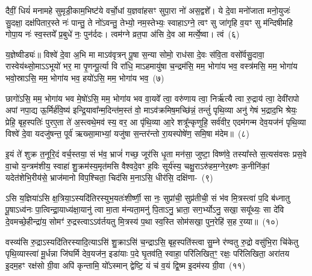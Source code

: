 {\anuvakamend[{मा॒ योनि॑रसि त्रि॒ꣳ॒शच्च॑}]}

दैवीं॒ धियं॑ मनामहे सुमृडी॒काम॒भिष्ट॑ये वर्चो॒धां य॒ज्ञवा॑हसꣳ सुपा॒रा नो॑ अस॒द्वशे᳚। ये दे॒वा मनो॑जाता मनो॒युजः॑ सु॒दक्षा॒ दक्ष॑पितार॒स्ते नः॑ पान्तु॒ ते नो॑\-ऽवन्तु॒ तेभ्यो॒ नम॒स्तेभ्यः॒ स्वाहा\-ऽग्ने॒ त्वꣳ सु जा॑गृहि व॒यꣳ सु म॑न्दिषीमहि गोपा॒य नः॑ स्व॒स्तये᳚ प्र॒बुधे॑ नः॒ पुन॑र्ददः। त्वम॑ग्ने व्रत॒पा अ॑सि दे॒व आ मर्त्ये॒ष्वा। त्वं~(६)\ip

य॒ज्ञेष्वीड्यः॑॥ विश्वे॑ दे॒वा अ॒भि मा मा\-ऽव॑वृत्रन् पू॒षा स॒न्या सोमो॒ राध॑सा दे॒वः स॑वि॒ता वसो᳚र्वसु॒दावा॒ रास्वेय॑थ्सो॒मा\-ऽऽ\-भूयो॑ भर॒ मा पृ॒णन्पू॒र्त्या वि रा॑धि॒ मा\-ऽहमायु॑षा च॒न्द्रम॑सि॒ मम॒ भोगा॑य भव॒ वस्त्र॑मसि॒ मम॒ भोगा॑य भवो॒स्रा\-ऽसि॒ मम॒ भोगा॑य भव॒ हयो॑\-ऽसि॒ मम॒ भोगा॑य भव॒~(७)\ip

छागो॑\-ऽसि॒ मम॒ भोगा॑य भव मे॒षो॑\-ऽसि॒ मम॒ भोगा॑य भव वा॒यवे᳚ त्वा॒ वरु॑णाय त्वा॒ निर्\mbox{}ऋ॑त्यै त्वा रु॒द्राय॑ त्वा॒ देवी॑रापो अपां नपा॒द्य ऊ॒र्मिर्\mbox{}ह॑वि॒ष्य॑ इन्द्रि॒यावा᳚न्म॒दिन्त॑म॒स्तं वो॒ मा\-ऽव॑क्रमिष॒मच्छि॑न्नं॒ तन्तुं॑ पृथि॒व्या अनु॑ गेषं भ॒द्राद॒भि श्रेयः॒ प्रेहि॒ बृह॒स्पतिः॑ पुरए॒ता ते॑ अ॒स्त्वथे॒मव॑ स्य॒ वर॒ आ पृ॑थि॒व्या आ॒रे शत्रू᳚न्कृणुहि॒ सर्व॑वीर॒ एदम॑गन्म देव॒यज॑नं पृथि॒व्या विश्वे॑ दे॒वा यदजु॑षन्त॒ पूर्व॑ ऋख्सा॒माभ्यां॒ यजु॑षा स॒न्तर॑न्तो रा॒यस्पोषे॑ण॒ समि॒षा म॑देम॥~(८)\ip

{\anuvakamend[{आ त्वꣳ हयो॑\-ऽसि॒ मम॒ भोगा॑य भव स्य॒ पञ्च॑विꣳशतिश्च}]}

इ॒यं ते॑ शुक्र त॒नूरि॒दं वर्च॒स्तया॒ सं भ॑व॒ भ्राजं॑ गच्छ॒ जूर॑सि धृ॒ता मन॑सा॒ जुष्टा॒ विष्ण॑वे॒ तस्या᳚स्ते स॒त्यस॑वसः प्रस॒वे वा॒चो य॒न्त्रम॑शीय॒ स्वाहा॑ शु॒क्रम॑स्य॒मृत॑मसि वैश्वदे॒वꣳ ह॒विः सूर्य॑स्य॒ चक्षु॒रा\-ऽरु॑हम॒ग्नेर॒क्ष्णः क॒नीनि॑कां॒ यदेत॑शेभि॒रीय॑से॒ भ्राज॑मानो विप॒श्चिता॒ चिद॑सि म॒ना\-ऽसि॒ धीर॑सि॒ दक्षि॑णा-~(९)\ip

ऽसि य॒ज्ञिया॑\-ऽसि क्ष॒त्रिया॒\-ऽस्यदि॑तिरस्युभ॒यतः॑शीर्ष्णी॒ सा नः॒ सुप्रा॑ची॒ सुप्र॑तीची॒ सं भ॑व मि॒त्रस्त्वा॑ प॒दि ब॑ध्नातु पू॒षा\-ऽध्व॑नः पा॒त्विन्द्रा॒याध्य॑क्षा॒यानु॑ त्वा मा॒ता म॑न्यता॒मनु॑ पि॒ता\-ऽनु॒ भ्राता॒ सग॒र्भ्यो\-ऽनु॒ सखा॒ सयू᳚थ्यः॒ सा दे॑वि दे॒वमच्छे॒हीन्द्रा॑य॒ सोमꣳ॑ रु॒द्रस्त्वा\-ऽऽ\-व॑र्तयतु मि॒त्रस्य॑ प॒था स्व॒स्ति सोम॑सखा॒ पुन॒रेहि॑ स॒ह र॒य्या॥~(१०)\ip

{\anuvakamend[{दक्षि॑णा॒ सोम॑सखा॒ पञ्च॑ च}]}

वस्व्य॑सि रु॒द्रा\-ऽस्यदि॑तिरस्यादि॒त्या\-ऽसि॑ शु॒क्रा\-ऽसि॑ च॒न्द्रा\-ऽसि॒ बृह॒स्पति॑स्त्वा सु॒म्ने र॑ण्वतु रु॒द्रो वसु॑भि॒रा चि॑केतु पृथि॒व्यास्त्वा॑ मू॒र्धन्ना जि॑घर्मि देव॒यज॑न॒ इडा॑याः प॒दे घृ॒तव॑ति॒ स्वाहा॒ परि॑लिखित॒ꣳ॒ रक्षः॒ परि॑लिखिता॒ अरा॑तय इ॒दम॒हꣳ रक्ष॑सो ग्री॒वा अपि॑ कृन्तामि॒ यो᳚\-ऽस्मान् द्वेष्टि॒ यं च॑ व॒यं द्वि॒ष्म इ॒दम॑स्य ग्री॒वा~(११)\ip

